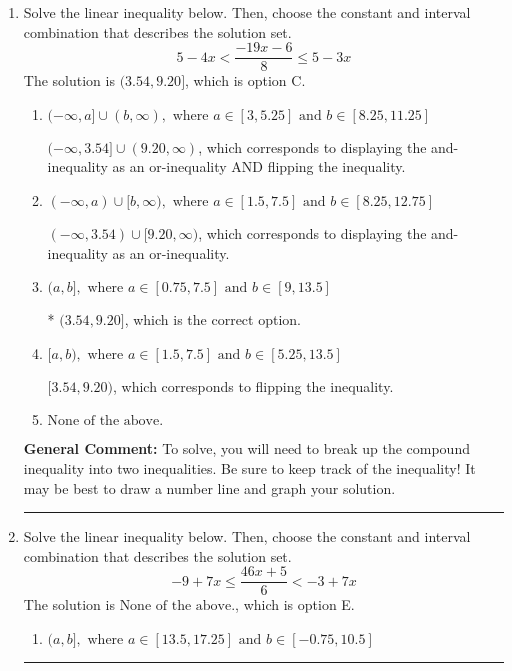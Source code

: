 \documentclass{extbook}[14pt]
\newcommand{\litem}[1]{\item #1

\rule{\textwidth}{0.4pt}}
\begin{document}
\begin{enumerate}
{\begin{enumerate}[label=\Alph*.]
 $(2.6, \infty)$, which corresponds to switching the direction of the interval. You likely did this if you did not flip the inequality when dividing by a negative!
\item \( \text{None of the above}. \)

You may have chosen this if you thought the inequality did not match the ends of the intervals.
\end{enumerate}

\textbf{General Comment:} Remember that less/greater than or equal to includes the endpoint, while less/greater do not. Also, remember that you need to flip the inequality when you multiply or divide by a negative.
}
\litem{
Solve the linear inequality below. Then, choose the constant and interval combination that describes the solution set.
\[ 5 - 4 x < \frac{-19 x - 6}{8} \leq 5 - 3 x \]The solution is \( (3.54, 9.20] \), which is option C.\begin{enumerate}[label=\Alph*.]
\item \( (-\infty, a] \cup (b, \infty), \text{ where } a \in [3, 5.25] \text{ and } b \in [8.25, 11.25] \)

$(-\infty, 3.54] \cup (9.20, \infty)$, which corresponds to displaying the and-inequality as an or-inequality AND flipping the inequality.
\item \( (-\infty, a) \cup [b, \infty), \text{ where } a \in [1.5, 7.5] \text{ and } b \in [8.25, 12.75] \)

$(-\infty, 3.54) \cup [9.20, \infty)$, which corresponds to displaying the and-inequality as an or-inequality.
\item \( (a, b], \text{ where } a \in [0.75, 7.5] \text{ and } b \in [9, 13.5] \)

* $(3.54, 9.20]$, which is the correct option.
\item \( [a, b), \text{ where } a \in [1.5, 7.5] \text{ and } b \in [5.25, 13.5] \)

$[3.54, 9.20)$, which corresponds to flipping the inequality.
\item \( \text{None of the above.} \)


\end{enumerate}

\textbf{General Comment:} To solve, you will need to break up the compound inequality into two inequalities. Be sure to keep track of the inequality! It may be best to draw a number line and graph your solution.
}
\litem{
Solve the linear inequality below. Then, choose the constant and interval combination that describes the solution set.
\[ -9 + 7 x \leq \frac{46 x + 5}{6} < -3 + 7 x \]The solution is \( \text{None of the above.} \), which is option E.\begin{enumerate}[label=\Alph*.]
\item \( (a, b], \text{ where } a \in [13.5, 17.25] \text{ and } b \in [-0.75, 10.5] \)


\end{enumerate}}
\end{enumerate}
\end{document}
